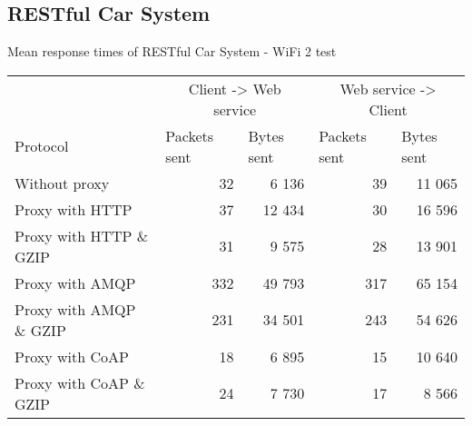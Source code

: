 \begin{appendices}
\subsection{RESTful Car System}

\begin{table}[H]

\caption{Mean response times of RESTful Car System - WiFi 2 test}
\end{table}

\begin{table}[H]
\begin{tabular}{lrrrr}
\hline
\multicolumn{1}{l}{}                  & \multicolumn{2}{c}{Client -> Web service}                           & \multicolumn{2}{c}{Web service -> Client}                           \\
\multicolumn{1}{l}{Protocol} & \multicolumn{1}{l}{Packets sent} & \multicolumn{1}{l}{Bytes sent} & \multicolumn{1}{l}{Packets sent} & \multicolumn{1}{l}{Bytes sent} \\ \hline
Without proxy                           & 32                                            & 6 136                                    & 39                                            & 11 065                                   \\
Proxy with HTTP                         & 37                                            & 12 434                                   & 30                                            & 16 596                                   \\
Proxy with HTTP \& GZIP                 & 31                                            & 9 575                                    & 28                                            & 13 901 \\
Proxy with AMQP                         & 332                                            & 49 793                                    & 317                                            & 65 154 \\
Proxy with AMQP \& GZIP                 & 231                                            & 34 501                                    & 243                                            & 54 626 \\
Proxy with CoAP                         & 18                                            & 6 895                                    & 15                                            & 10 640 \\
Proxy with CoAP \& GZIP                 & 24                                            & 7 730                                    & 17                                            & 8 566


\end{tabular}
\end{table}
\end{appendices}
